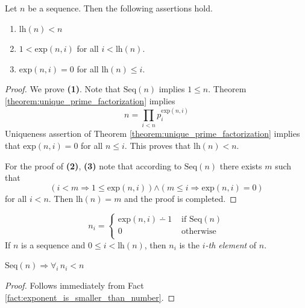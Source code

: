 \documentclass[10pt]{amsart}
\newcommand{\mforall}{\boldsymbol{\forall}}
\newcommand{\mra}{\boldsymbol{\Rightarrow}}
\newcommand{\mand}{\boldsymbol{\wedge}}
\newcommand{\mle}{\boldsymbol{<}}
\newcommand{\mleq}{\boldsymbol{\leq}}
\newcommand{\meq}{\boldsymbol{=}}
\begin{document}
\begin{fact}\label{fact:properties_of_sequence_length}
	Let $n$ be a sequence. Then the following assertions hold.
	\begin{enumerate}[label=\emph{\textbf{(\arabic*)}}, leftmargin=3.0em]
		\item $\mathrm{lh}(n) \mle n$
		\item $1 \mle \mathrm{exp}(n,i)$ for all $i \mle \mathrm{lh}(n)$.
		\item $\mathrm{exp}(n,i) \meq 0$ for all $\mathrm{lh}(n) \mleq i$.
	\end{enumerate}
\end{fact}
\begin{proof}
	We prove \textbf{(1)}. Note that $\mathrm{Seq}(n)$ implies $1 \mleq n$. Theorem \ref{theorem:unique_prime_factorization} implies
	$$n \meq \prod_{i \mle n}p_i^{\mathrm{exp}(n,i)}$$
	Uniqueness assertion of Theorem \ref{theorem:unique_prime_factorization} implies that $\mathrm{exp}(n,i) \meq 0$ for all $n \mleq i$. This proves that $\mathrm{lh}(n) \mle n$.

	For the proof of \textbf{(2)}, \textbf{(3)} note that according to $\mathrm{Seq}(n)$ there exists $m$ such that
	$$\left(i \mle m \mra 1 \mleq \mathrm{exp}(n,i)\right) \mand \left(m \mleq i \mra \mathrm{exp}(n,i) \meq 0\right)$$
	for all $i \mle n$. Then $\mathrm{lh}(n) \meq m$ and the proof is completed.
\end{proof}

\begin{definition}
	$$n_i \meq \begin{cases}
			\mathrm{exp}(n,i) \dotminus 1 & \mbox{ if }\mathrm{Seq}(n) \\
			0                             & \mbox{ otherwise }         \\
		\end{cases}
	$$
	If $n$ is a sequence and $0 \mleq i \mle \mathrm{lh}(n)$, then $n_i$ is the \textit{$i$-th element} of $n$.
\end{definition}

\begin{corollary}\label{corollary:sequence_element_is_smaller_than_sequence_itself}
	$\mathrm{Seq}(n) \mra \mforall_i\,n_i \mle n$
\end{corollary}
\begin{proof}
	Follows immediately from Fact \ref{fact:exponent_is_smaller_than_number}.
\end{proof}
\end{document}
